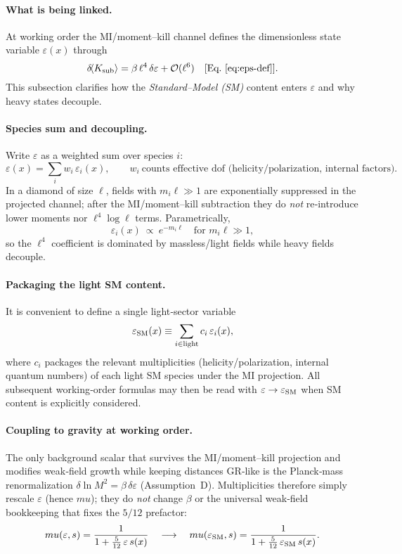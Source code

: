 \documentclass[aps,prd,onecolumn,superscriptaddress,nofootinbib]{revtex4-2}
\def\mu{mu}%
\begin{document}
\paragraph{What is being linked.}
At working order the MI/moment–kill channel defines the dimensionless state variable \(\varepsilon(x)\) through
\[
\delta\!\langle K_{\rm sub}\rangle=\beta\,\ell^4\,\delta\varepsilon+\mathcal O(\ell^6)
\quad\text{[Eq.~\eqref{eq:eps-def}].}
\]
This subsection clarifies how the \emph{Standard–Model (SM)} content enters \(\varepsilon\) and why heavy states decouple.

\paragraph{Species sum and decoupling.}
Write \(\varepsilon\) as a weighted sum over species \(i\):
\[
\varepsilon(x)=\sum_{i}w_i\,\varepsilon_i(x),\qquad
w_i\ \text{counts effective dof (helicity/polarization, internal factors)}.
\]
In a diamond of size \(\ell\), fields with \(m_i\ell\gg 1\) are exponentially suppressed in the projected channel; after the MI/moment–kill subtraction they do \emph{not} re‑introduce lower moments nor \(\ell^4\log\ell\) terms. Parametrically,
\[
\varepsilon_i(x)\ \propto\ e^{-m_i\ell}\quad\text{for }m_i\ell\gg 1,
\]
so the \(\ell^4\) coefficient is dominated by massless/light fields while heavy fields decouple.

\paragraph{Packaging the light SM content.}
It is convenient to define a single light‑sector variable
\[
\varepsilon_{\rm SM}(x)\equiv\sum_{i\in \text{light}} c_i\,\varepsilon_i(x),
\]
where \(c_i\) packages the relevant multiplicities (helicity/polarization, internal quantum numbers) of each light SM species under the MI projection. All subsequent working‑order formulas may then be read with \(\varepsilon\to \varepsilon_{\rm SM}\) when SM content is explicitly considered.

\paragraph{Coupling to gravity at working order.}
The only background scalar that survives the MI/moment–kill projection and modifies weak‑field growth while keeping distances GR‑like is the Planck‑mass renormalization \(\delta\!\ln M^2=\beta\,\delta\varepsilon\) (Assumption~D). Multiplicities therefore simply rescale \(\varepsilon\) (hence \(\mu\)); they do \emph{not} change \(\beta\) or the universal weak‑field bookkeeping that fixes the \(5/12\) prefactor:
\[
\mu(\varepsilon,s)=\frac{1}{1+\tfrac{5}{12}\,\varepsilon\,s(x)}
\quad\longrightarrow\quad
\mu(\varepsilon_{\rm SM},s)=\frac{1}{1+\tfrac{5}{12}\,\varepsilon_{\rm SM}\,s(x)}.
\]
\end{document}
